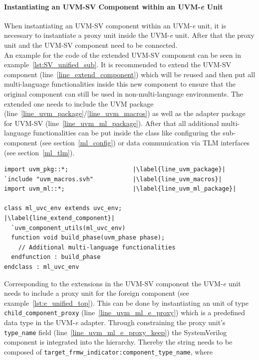 \paragraph{Instantiating an UVM-SV Component within an UVM-\textit{e} Unit}
\label{sv_inside_e}
When instantiating an UVM-SV component within an UVM-\textit{e} unit,
it is necessary to instantiate a proxy unit inside the UVM-\textit{e} unit. After that the
proxy unit and the UVM-SV component need to be connected. \\
An example for the code of the extended UVM-SV component can be seen in
example~\ref{lst:SV_unified_sub}.
It is recommended to extend the UVM-SV component
(line~\ref{line_extend_component}) which will
be reused and then put all multi-language functionalities inside this new
component to ensure that the original component can still be used in
non-multi-language environments. The extended one needs to include the UVM
package (line~\ref{line_uvm_package}/\ref{line_uvm_macros}) as well as the adapter
package for UVM-SV (line~\ref{line_uvm_ml_package}).
After that all additional multi-language functionalities can be put inside the
class like configuring the sub-component (see section~\ref{ml_config}) or data
communication via TLM interfaces (see section~\ref{ml_tlm}).
\medskip
{}
\begin{lstlisting}[frame=htrbl, caption={SystemVerilog: extended multi-language component}, label={lst:SV_unified_sub}]
import uvm_pkg::*;					|\label{line_uvm_package}|
`include "uvm_macros.svh"			|\label{line_uvm_macros}|
import uvm_ml::*;					|\label{line_uvm_ml_package}|

class ml_uvc_env extends uvc_env;			|\label{line_extend_component}|
  `uvm_component_utils(ml_uvc_env)
  function void build_phase(uvm_phase phase);
    // Additional multi-language functionalities
  endfunction : build_phase
endclass : ml_uvc_env
\end{lstlisting}
\medskip
Corresponding to the extensions in the UVM-SV component the UVM-\textit{e}
unit needs to include a proxy unit for the foreign component (see example~\ref{lst:e_unified_top}).
This can be done by instantiating an unit of type
\lstinline$child_component_proxy$ (line~\ref{line_uvm_ml_e_proxy}) which is a
predefined data type in the UVM-\textit{e} adapter.
Through constraining the proxy unit's \lstinline$type_name$ field
(line~\ref{line_uvm_ml_e_proxy_keep}) the
SystemVerilog component is integrated into the hierarchy. Thereby the string
needs to be composed of \lstinline$target_frmw_indicator:component_type_name$, where
